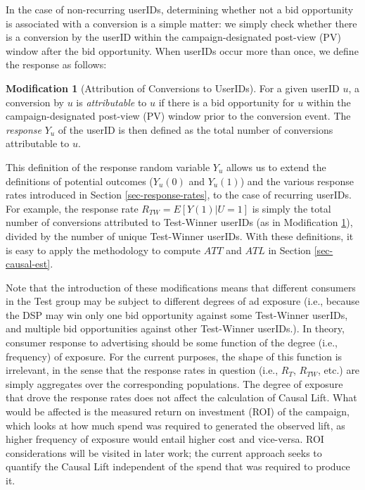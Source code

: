 \documentclass[11pt,a4paper]{article}
\theoremstyle{definition}
\theoremstyle{remark}
\theoremstyle{definition}
\theoremstyle{definition}
\theoremstyle{definition}
\theoremstyle{definition}
\theoremstyle{definition}
\newtheorem{modification}{Modification}[section]
\theoremstyle{definition}
\begin{document}
In the case of non-recurring userIDs, determining whether not a bid opportunity is associated with a conversion is a simple matter: we simply check whether there is a conversion by the userID within the campaign-designated post-view (PV) window after the bid opportunity. 
When userIDs occur more than once, we define the response as follows:

\begin{modification}[Attribution of Conversions to UserIDs] \label{mod-response}
	For a given userID $u$, a conversion by $u$ is \textit{attributable} to $u$ if there is a bid opportunity for $u$ within the campaign-designated post-view (PV) window prior to the conversion event. The \textit{response} $Y_u$ of the userID is then defined as the total number of conversions attributable to $u$.
\end{modification}

This definition of the response random variable $Y_u$ allows us to extend the definitions of potential outcomes ($Y_u(0)$ and $Y_u(1)$) and the various response rates introduced in Section \ref{sec-response-rates}, to the case of recurring userIDs. For example, the response rate $R_{TW} = E[Y(1) | U=1]$ is simply the total number of conversions attributed to Test-Winner userIDs (as in Modification \ref{mod-response}), divided by the number of unique Test-Winner userIDs. With these definitions, it is easy to apply the methodology to compute $ATT$ and $ATL$ in Section \ref{sec-causal-est}.

Note that the introduction of these modifications means that different consumers in the Test group may be subject to different degrees of ad exposure (i.e., because the DSP may win only one bid opportunity against some Test-Winner userIDs, and multiple bid opportunities against other Test-Winner userIDs.). In theory, consumer response to advertising should be some function of the degree (i.e., frequency) of exposure. For the current purposes, the shape of this function is irrelevant, in the sense that the response rates in question (i.e., $R_{T}$, $R_{TW}$, etc.) are simply aggregates over the corresponding populations. The degree of exposure that drove the response rates does not affect the calculation of Causal Lift. What would be affected is the measured return on investment (ROI) of the campaign, which looks at how much spend was required to generated the observed lift, as higher frequency of exposure would entail higher cost and vice-versa. ROI considerations will be visited in later work; the current approach seeks to quantify the Causal Lift independent of the spend that was required to produce it.
\end{document}
